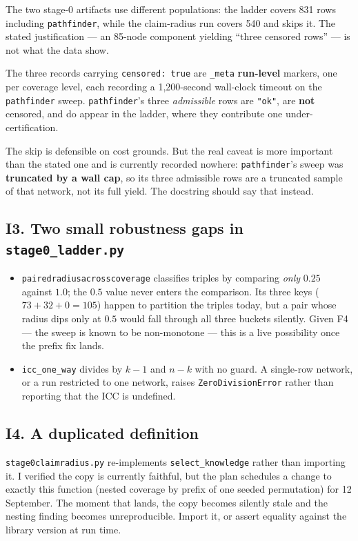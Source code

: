\documentclass[11pt,a4paper]{article}
\newcommand{\code}[1]{\texttt{\small\hspace{0pt}#1}}
\newcommand{\ul}{\discretionary{\_}{}{\_}}
\begin{document}
The two stage-0 artifacts use different populations: the ladder covers 831 rows including
\code{pathfinder}, while the claim-radius run covers 540 and skips it. The stated justification
--- an 85-node component yielding ``three censored rows'' --- is not what the data show.

The three records carrying \code{censored: true} are \code{\_meta} \textbf{run-level} markers, one
per coverage level, each recording a 1{,}200-second wall-clock timeout on the \code{pathfinder}
sweep. \code{pathfinder}'s three \emph{admissible} rows are \code{"ok"}, are \textbf{not} censored,
and do appear in the ladder, where they contribute one under-certification.

The skip is defensible on cost grounds. But the real caveat is more important than the stated one
and is currently recorded nowhere: \code{pathfinder}'s sweep was \textbf{truncated by a wall cap},
so its three admissible rows are a truncated sample of that network, not its full yield. The
docstring should say that instead.

\subsection{I3. Two small robustness gaps in \code{stage0\_ladder.py}}

\begin{itemize}[leftmargin=1.4em,itemsep=0.2em]
\item \code{paired\ul radius\ul across\ul coverage} classifies triples by comparing \emph{only} $0.25$
against $1.0$; the $0.5$ value never enters the comparison. Its three keys
($73 + 32 + 0 = 105$) happen to partition the triples today, but a pair whose radius dips only at
$0.5$ would fall through all three buckets silently. Given F4 --- the sweep is known to be
non-monotone --- this is a live possibility once the prefix fix lands.

\item \code{icc\_one\_way} divides by $k-1$ and $n-k$ with no guard. A single-row network, or a
run restricted to one network, raises \code{ZeroDivisionError} rather than reporting that the ICC
is undefined.
\end{itemize}

\subsection{I4. A duplicated definition}

\code{stage0\ul claim\ul radius.py} re-implements \code{select\_knowledge} rather than importing it.
I verified the copy is currently faithful, but the plan schedules a change to exactly this function
(nested coverage by prefix of one seeded permutation) for 12 September. The moment that lands, the
copy becomes silently stale and the nesting finding becomes unreproducible. Import it, or assert
equality against the library version at run time.
\end{document}

